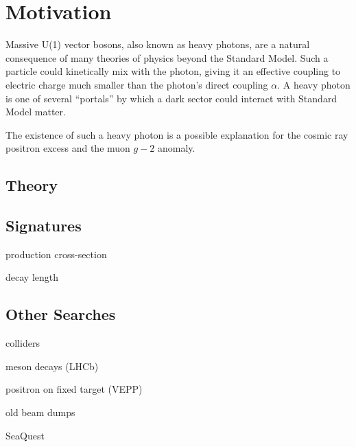 \chapter{Motivation}
Massive U(1) vector bosons, also known as heavy photons, are a natural consequence of many theories of physics beyond the Standard Model.
Such a particle could kinetically mix with the photon, giving it an effective coupling to electric charge much smaller than the photon's direct coupling $\alpha$.
A heavy photon is one of several ``portals'' by which a dark sector could interact with Standard Model matter.

The existence of such a heavy photon is a possible explanation for the cosmic ray positron excess and the muon $g-2$ anomaly.

\section{Theory}


\section{Signatures}

production cross-section

decay length

\section{Other Searches}


colliders

meson decays (LHCb)

positron on fixed target (VEPP)

old beam dumps

SeaQuest
